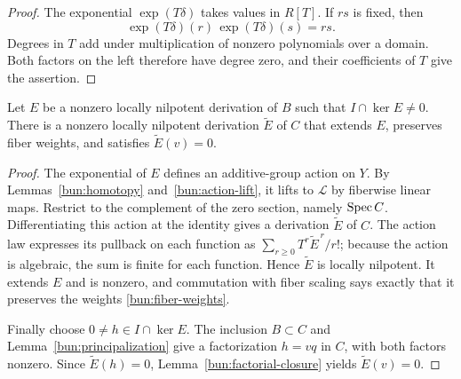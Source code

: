 \begin{proof}
The exponential $\exp(T\delta)$ takes values in $R[T]$.  If $rs$ is fixed,
then
\[
 \exp(T\delta)(r)\,\exp(T\delta)(s)=rs.
\]
Degrees in $T$ add under multiplication of nonzero polynomials over a
domain.  Both factors on the left therefore have degree zero, and their
coefficients of $T$ give the assertion.
\end{proof}

\begin{proposition}\label{prop:lift}
Let $E$ be a nonzero locally nilpotent derivation of $B$ such that
$I\cap\ker E\ne0$.  There is a nonzero locally nilpotent derivation
$\widetilde E$ of $C$ that extends $E$, preserves fiber weights, and satisfies
$\widetilde E(v)=0$.
\end{proposition}

\begin{proof}
The exponential of $E$ defines an additive-group action on $Y$.
By Lemmas~\ref{bun:homotopy} and~\ref{bun:action-lift}, it lifts to
$\mathcal L$ by fiberwise linear maps.  Restrict to the complement of the
zero section, namely $\operatorname{Spec} C$.
Differentiating this action at the identity gives a derivation
$\widetilde E$ of $C$.  The action law expresses its pullback on each
function as $\sum_{r\ge0}T^r\widetilde E^{\,r}/r!$; because the action is
algebraic, the sum is finite for each function.  Hence $\widetilde E$ is
locally nilpotent.  It extends $E$ and is nonzero, and commutation with
fiber scaling says exactly that it preserves the weights
\eqref{bun:fiber-weights}.

Finally choose $0\ne h\in I\cap\ker E$.  The inclusion $B\subset C$ and
Lemma~\ref{bun:principalization} give a factorization $h=vq$ in $C$, with
both factors nonzero.  Since $\widetilde E(h)=0$,
Lemma~\ref{bun:factorial-closure} yields $\widetilde E(v)=0$.
\end{proof}
